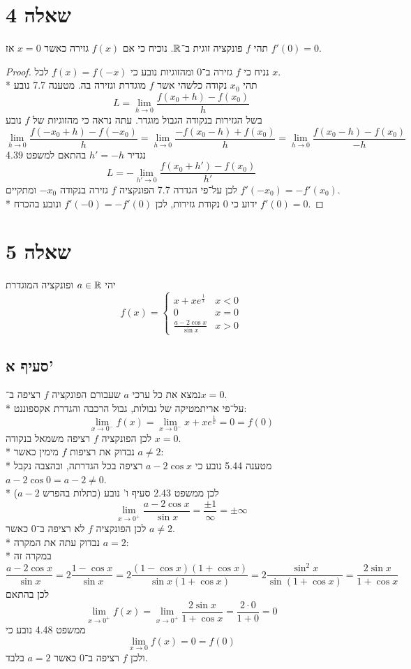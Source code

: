 \section{שאלה 4}
תהי $f$ פונקציה זוגית ב־$\mathbb{R}$. נוכיח כי אם $f(x)$ גזירה כאשר $x = 0$ אז $f'(0) = 0$.
\begin{proof}
	נניח כי $f$ גזירה ב־$0$ ומהזוגיות נובע כי $f(x) = f(-x)$ לכל $x$. \\*
	תהי $x_0$ נקודה כלשהי אשר $f$ מוגדרת וגזירה בה. מטענה 7.7 נובע
	\[
		L = \lim_{h \to 0} \frac{f(x_0 + h) - f(x_0)}{h}
	\]
	בשל הגזירות בנקודה הגבול מוגדר. עתה נראה כי מהזוגיות של $f$ נובע
	\[
		\lim_{h \to 0} \frac{f(-x_0 + h) - f(-x_0)}{h}
		= \lim_{h \to 0} \frac{- f(x_0 - h) + f(x_0)}{h}
		= \lim_{h \to 0} \frac{f(x_0 - h) - f(x_0)}{-h}
	\]
	נגדיר $h' = -h$ בהתאם למשפט 4.39
	\[
		L = - \lim_{h' \to 0} \frac{f(x_0 + h') - f(x_0)}{h'}
	\]
	לכן על־פי הגדרה 7.7 הפונקציה $f$ גזירה בנקודה $-x_0$ ומתקיים $f'(-x_0) = -f'(x_0)$. \\*
	ידוע כי $0$ נקודת גזירות, לכן $f'(-0) = -f'(0)$ ונובע בהכרח $f'(0) = 0$.
\end{proof}

\section{שאלה 5}
יהי $a \in \mathbb{R}$ ופונקציה המוגדרת
\[
	f(x) = \begin{cases}
		x + x e^{\frac{1}{x}} & x < 0 \\
		0 & x = 0 \\
		\frac{a - 2 \cos x}{\sin x} & x > 0
	\end{cases}
\]

\subsection{סעיף א'}
נמצא את כל ערכי $a$ שעבורם הפונקציה $f$ רציפה ב־$x = 0$. \\*
על־פי אריתמטיקה של גבולות, גבול הרכבה והגדרת אקספוננט:
\[
	\lim_{x \to 0^-} f(x) = 
	\lim_{x \to 0^-} x + x e^{\frac{1}{x}}
	= 0 = f(0)
\]
לכן הפונקציה $f$ רציפה משמאל בנקודה $x = 0$. \\*
נבדוק את רציפות $f$ מימין כאשר $a \ne 2$: \\*
מטענה 5.44 נובע כי $a - 2 \cos x$ רציפה בכל הגדרתה, ובהצבה נקבל $a - 2 \cos 0 = a - 2 \ne 0$. \\*
לכן ממשפט 2.43 סעיף ו' נובע (כתלות בהפרש $a - 2$)
\[
	\lim_{x \to 0^+} \frac{a - 2 \cos x}{\sin x} = \frac{\pm1}{\infty} = \pm \infty
\]
לכן הפונקציה $f$ לא רציפה ב־$0$ כאשר $a \ne 2$. \\*
נבדוק עתה את המקרה $a = 2$: \\*
במקרה זה
\[
	\frac{a - 2 \cos x}{\sin x}
	= 2 \frac{1 - \cos x}{\sin x}
	= 2 \frac{(1 - \cos x)(1 + \cos x)}{\sin x(1 + \cos x)}
	= 2 \frac{\sin^2 x}{\sin (1 + \cos x)}
	= \frac{2 \sin x}{1 + \cos x}
\]
לכן בהתאם
\[
	\lim_{x \to 0^+} f(x) = \lim_{x \to 0^+} \frac{2 \sin x}{1 + \cos x} = \frac{2 \cdot 0}{1 + 0} = 0
\]
ממשפט 4.48 נובע כי
\[
	\lim_{x \to 0} f(x) = 0 = f(0)
\]
ולכן $f$ רציפה ב־$0$ כאשר $a = 2$ בלבד.

